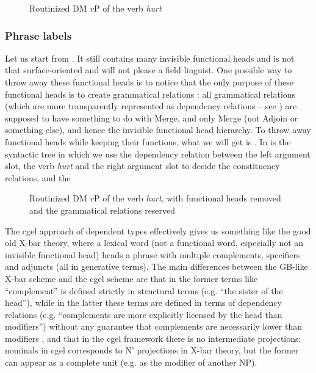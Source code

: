 \documentclass[../main.tex]{subfiles}
\begin{document}
\begin{figure}
    \centering
    
    \caption{Routinized DM $v$P of the verb \emph{hurt}}
    \label{fig:hurt-dm-routine}
\end{figure}


\subsubsection{Phrase labels}\label{sec:phrase-label}


Let us start from . It still contains many invisible functional heads and is not 
that surface-oriented and will not please a field linguist. One possible way to throw away these functional
heads is to notice that the only purpose of these functional heads is to create grammatical relations \citep{hornstein2021extended}: all grammatical relations (which are more transparently represented as dependency 
relations -- see ) are supposed to have something to do with Merge, 
and only Merge (not Adjoin or something else), and hence the invisible functional head hierarchy.
To throw away functional heads while keeping their functions, what we will get is . In  is the syntactic tree in which 
we use the dependency relation between the left argument slot, the verb \emph{hurt} and the right 
argument slot to decide the constituency relations, and the %

\begin{figure}
    \centering
    

    \caption{Routinized DM $v$P of the verb \emph{hurt}, with functional heads removed and the grammatical relations reserved}
    \label{fig:hurt-constituent-tree}
\end{figure}


The \ac{cgel} approach of dependent types effectively gives us something like the good old X-bar theory, where a lexical word 
(not a functional word, especially not an invisible functional head) heads a phrase with multiple 
complements, specifiers and adjuncts (all in generative terms). The main differences between the GB-like 
X-bar scheme and the \ac{cgel} scheme are that in the former terms like ``complement'' is defined strictly 
in structural terms (e.g. ``the sister of the head''), while in the latter these terms are defined in 
terms of dependency relations (e.g. ``complements are more explicitly licensed by the head than 
modifiers'') without any guarantee that complements are necessarily lower than modifiers \citep{payne2007fusion},
and that in the \ac{cgel} framework there is no intermediate projections: nominals in \ac{cgel} corresponds 
to N' projections in X-bar theory, but the former can appear as a complete unit (e.g. as the modifier of another 
NP). 
\end{document}
